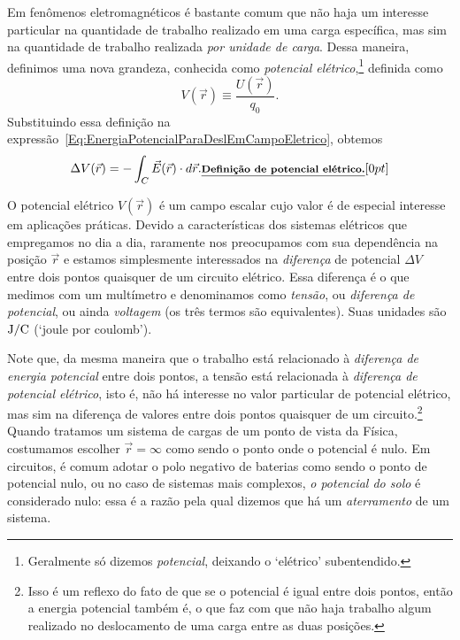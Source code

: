 Em fenômenos eletromagnéticos é bastante comum que não haja um interesse particular na quantidade de trabalho realizado em uma carga específica, mas sim na quantidade de trabalho realizada \emph{por unidade de carga}. Dessa maneira, definimos uma nova grandeza, conhecida como \emph{potencial elétrico},\footnote{Geralmente só dizemos \emph{potencial}, deixando o `elétrico' subentendido.} definida como
\begin{equation}
    V(\vec{r}) \equiv \frac{U(\vec{r})}{q_0}.
\end{equation}
%
Substituindo essa definição na expressão~\eqref{Eq:EnergiaPotencialParaDeslEmCampoEletrico}, obtemos
\begin{equation}\label{Eq:ExprPotencialEletrico}
    \Delta V(\vec{r}) = - \int_C \vec{E}(\vec{r}) \cdot d\vec{r}. \relax{\footnotesize\emph{\textbf{Definição de potencial elétrico.}}}[0pt]
\end{equation}

O potencial elétrico $V(\vec{r})$ é um campo escalar cujo valor é de especial interesse em aplicações práticas. Devido a características dos sistemas elétricos que empregamos no dia a dia, raramente nos preocupamos com sua dependência na posição $\vec{r}$ e estamos simplesmente interessados na \emph{diferença} de potencial $\Delta V$ entre dois pontos quaisquer de um circuito elétrico. Essa diferença é o que medimos com um multímetro e denominamos como \emph{tensão}, ou \emph{diferença de potencial}, ou ainda \emph{voltagem} (os três termos são equivalentes). Suas unidades são $\rm{J}/\rm{C}$ (`joule por coulomb'). 

Note que, da mesma maneira que o trabalho está relacionado à \emph{diferença de energia potencial} entre dois pontos, a tensão está relacionada à \emph{diferença de potencial elétrico}, isto é, não há interesse no valor particular de potencial elétrico, mas sim na diferença de valores entre dois pontos quaisquer de um circuito.\footnote{Isso é um reflexo do fato de que se o potencial é igual entre dois pontos, então a energia potencial também é, o que faz com que não haja trabalho algum realizado no deslocamento de uma carga entre as duas posições.} Quando tratamos um sistema de cargas de um ponto de vista da Física, costumamos escolher $\vec{r} = \infty$ como sendo o ponto onde o potencial é nulo. Em circuitos, é comum adotar o polo negativo de baterias como sendo o ponto de potencial nulo, ou no caso de sistemas mais complexos, \emph{o potencial do solo} é considerado nulo: essa é a razão pela qual dizemos que há um \emph{aterramento} de um sistema.

